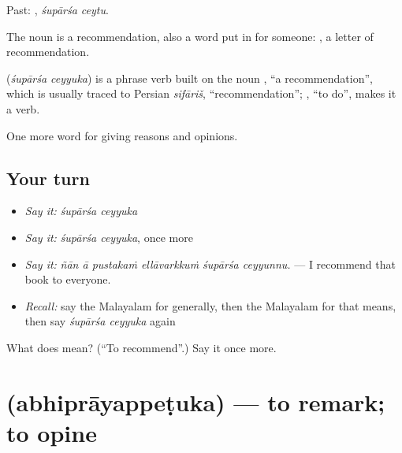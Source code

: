 Past:  , \emph{śupārśa ceytu}.

The noun  is a recommendation, also a word put in for someone:  , a letter of recommendation.

\begin{cousinweb}
\textbf{ } (\emph{śupārśa ceyyuka}) is a phrase verb built on the noun , \textquotedblleft{}a recommendation\textquotedblright{}, which is usually traced to Persian \emph{sifāriš}, \textquotedblleft{}recommendation\textquotedblright{}; , \textquotedblleft{}to do\textquotedblright{}, makes it a verb.
\end{cousinweb}

\begin{grammarlens}[title={What you've built}]
One more word for giving reasons and opinions.
\end{grammarlens}

\subsection*{Your turn}
\begin{itemize}
\raggedright
  \item \emph{Say it:} \emph{śupārśa ceyyuka}
  \item \emph{Say it:} \emph{śupārśa ceyyuka}, once more
  \item \emph{Say it:} \emph{ñān ā pustakaṁ ellāvarkkuṁ śupārśa ceyyunnu.} — I recommend that book to everyone.
  \item \emph{Recall:} say the Malayalam for generally, then the Malayalam for that means, then say \emph{śupārśa ceyyuka} again
\end{itemize}

\begin{tcolorbox}[breakable,colback=teal!4,colframe=teal!35!black,title={Before you move on}]
What does   mean? (\textquotedblleft{}To recommend\textquotedblright{}.) Say it once more.
\end{tcolorbox}
\section[\texorpdfstring{\ml{അഭിപ്രായപ്പെടുക} (abhiprāyappeṭuka)}{അഭിപ്രായപ്പെടുക (abhiprāyappeṭuka)}]{ (abhiprāyappeṭuka) — to remark; to opine}

\label{lesson:ML-C413-abhiprayappetuka}



